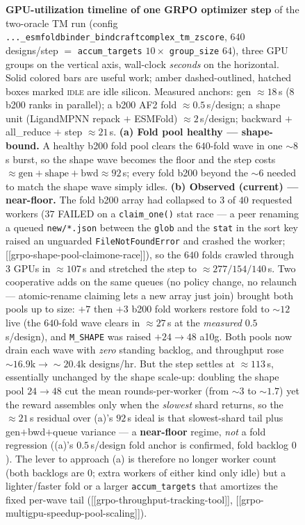 \documentclass[11pt]{article}
\newcommand{\ttk}[1]{\texttt{\small #1}}
\begin{document}
\begin{figure}[htbp]
\caption{\textbf{GPU-utilization timeline of one GRPO optimizer step} of the two-oracle TM run
(config \ttk{...\_esmfoldbinder\_bindcraftcomplex\_tm\_zscore}, $640$ designs/step $=$ \ttk{accum\_targets}
$10\times$ \ttk{group\_size} $64$), three GPU groups on the vertical axis, wall-clock \emph{seconds} on
the horizontal. Solid colored bars are useful work; \textcolor{bLine}{amber dashed-outlined, hatched}
boxes marked \textsc{idle} are idle silicon. Measured anchors: gen $\approx\!18$\,s ($8$ b200 ranks in
parallel); a b200 AF2 fold $\approx\!0.5$\,s/design; a shape unit (LigandMPNN repack $+$ ESMFold)
$\approx\!2$\,s/design; backward
$+$ all\_reduce $+$ step $\approx\!21$\,s. \textbf{(a) Fold pool healthy --- shape-bound.} A healthy
b200 fold pool clears the $640$-fold wave in one $\sim\!8$\,s burst, so the shape wave becomes the floor
and the step costs $\approx\text{gen}+\text{shape}+\text{bwd}\approx92$\,s; every fold b200 beyond the
$\sim\!6$ needed to match the shape wave simply idles. \textbf{(b) Observed (current) --- near-floor.}
The fold b200 array had collapsed to $3$ of $40$ requested workers ($37$ FAILED on a \ttk{claim\_one()}
stat race --- a peer renaming a queued \ttk{new/*.json} between the \ttk{glob} and the \ttk{stat} in the
sort key raised an unguarded \ttk{FileNotFoundError} and crashed the worker;
[[grpo-shape-pool-claimone-race]]), so the $640$ folds crawled through $3$ GPUs in $\approx\!107$\,s and
stretched the step to $\approx\!277/154/140$\,s. Two cooperative adds on the same queues (no policy
change, no relaunch --- atomic-rename claiming lets a new array just join) brought both pools up to size:
$+7$ then $+3$ b200 fold workers restore fold to $\sim\!12$ live (the $640$-fold wave clears in
$\approx\!27$\,s at the \emph{measured} $0.5$\,s/design), and \ttk{M\_SHAPE} was raised $+24\to48$ a10g.
Both pools now drain each wave with \emph{zero} standing backlog, and throughput rose
$\sim\!16.9$k$\to\!\sim\!20.4$k designs/hr. But the step settles at $\approx\!113$\,s, essentially
unchanged by the shape scale-up: doubling the shape pool $24\to48$ cut the mean rounds-per-worker
(from $\sim\!3$ to $\sim\!1.7$) yet the reward assembles only when the \emph{slowest} shard returns, so
the $\approx\!21$\,s residual over (a)'s $92$\,s ideal is that slowest-shard tail plus gen$+$bwd$+$queue
variance --- a \textbf{near-floor} regime, \emph{not} a fold regression ((a)'s $0.5$\,s/design fold anchor
is confirmed, fold backlog $0$). The lever to approach (a) is therefore no longer worker count (both
backlogs are $0$; extra workers of either kind only idle) but a lighter/faster fold or a larger
\ttk{accum\_targets} that amortizes the fixed per-wave tail
([[grpo-throughput-tracking-tool]], [[grpo-multigpu-speedup-pool-scaling]]).}
\label{fig:gpuutil}
\end{figure}
\end{document}
